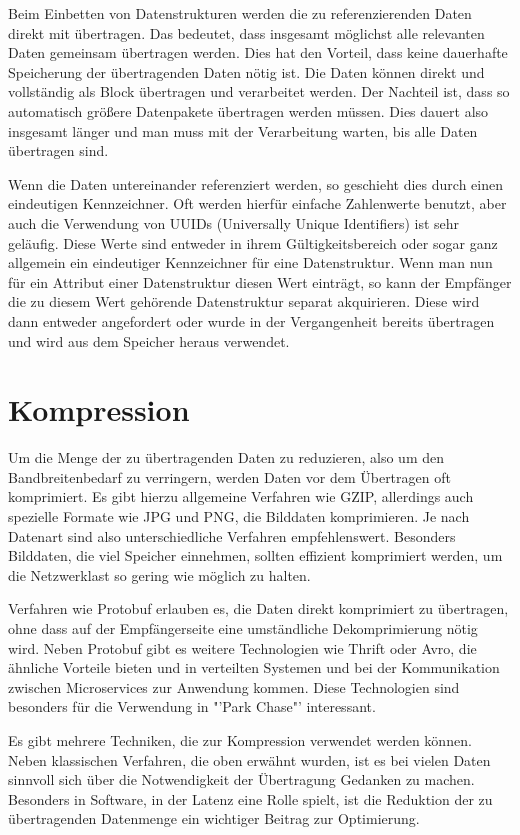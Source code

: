 Beim Einbetten von Datenstrukturen werden die zu referenzierenden Daten direkt mit übertragen. Das bedeutet, dass insgesamt möglichst alle relevanten Daten gemeinsam übertragen werden. Dies hat den Vorteil, dass keine dauerhafte Speicherung der übertragenden Daten nötig ist. Die Daten können direkt und vollständig als Block übertragen und verarbeitet werden. Der Nachteil ist, dass so automatisch größere Datenpakete übertragen werden müssen. Dies dauert also insgesamt länger und man muss mit der Verarbeitung warten, bis alle Daten übertragen sind.

Wenn die Daten untereinander referenziert werden, so geschieht dies durch einen eindeutigen Kennzeichner. Oft werden hierfür einfache Zahlenwerte benutzt, aber auch die Verwendung von UUIDs (Universally Unique Identifiers) ist sehr geläufig. Diese Werte sind entweder in ihrem Gültigkeitsbereich oder sogar ganz allgemein ein eindeutiger Kennzeichner für eine Datenstruktur. Wenn man nun für ein Attribut einer Datenstruktur diesen Wert einträgt, so kann der Empfänger die zu diesem Wert gehörende Datenstruktur separat akquirieren. Diese wird dann entweder angefordert oder wurde in der Vergangenheit bereits übertragen und wird aus dem Speicher heraus verwendet.

\section{Kompression}

Um die Menge der zu übertragenden Daten zu reduzieren, also um den Bandbreitenbedarf zu verringern, werden Daten vor dem Übertragen oft komprimiert. Es gibt hierzu allgemeine Verfahren wie GZIP, allerdings auch spezielle Formate wie JPG und PNG, die Bilddaten komprimieren. Je nach Datenart sind also unterschiedliche Verfahren empfehlenswert. Besonders Bilddaten, die viel Speicher einnehmen, sollten effizient komprimiert werden, um die Netzwerklast so gering wie möglich zu halten.

Verfahren wie Protobuf erlauben es, die Daten direkt komprimiert zu übertragen, ohne dass auf der Empfängerseite eine umständliche Dekomprimierung nötig wird. Neben Protobuf gibt es weitere Technologien wie Thrift oder Avro, die ähnliche Vorteile bieten und in verteilten Systemen und bei der Kommunikation zwischen Microservices zur Anwendung kommen. Diese Technologien sind besonders für die Verwendung in "'Park Chase"' interessant.

Es gibt mehrere Techniken, die zur Kompression verwendet werden können. Neben klassischen Verfahren, die oben erwähnt wurden, ist es bei vielen Daten sinnvoll sich über die Notwendigkeit der Übertragung Gedanken zu machen. Besonders in Software, in der Latenz eine Rolle spielt, ist die Reduktion der zu übertragenden Datenmenge ein wichtiger Beitrag zur Optimierung.

